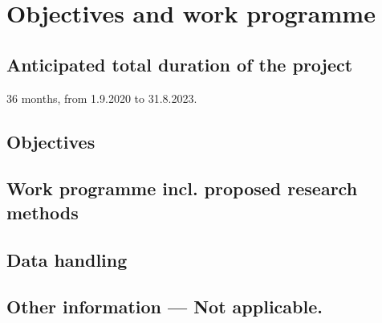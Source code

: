 \documentclass{dfg_en}
\newcounter{objectives}
\newcommand*{\addtopatangemeldet}[1]{\addtocategory{patente-angemeldet}{#1}\nocite{#1}}
\newcommand*{\addtopatakzeptiert}[1]{\addtocategory{patente-akzeptiert}{#1}\nocite{#1}}
\newcommand{\emptyheading}{ \mdseries--- Not applicable.}
\begin{document}

%

%


\section{Objectives and work programme}

\subsection{Anticipated total duration of the project}
36 months, from 1.9.2020 to 31.8.2023.

\subsection{Objectives}\label{sec:objectives}


\subsection{Work programme incl. proposed research methods}


\subsection{Data handling}


\subsection{Other information\emptyheading}
\end{document}

